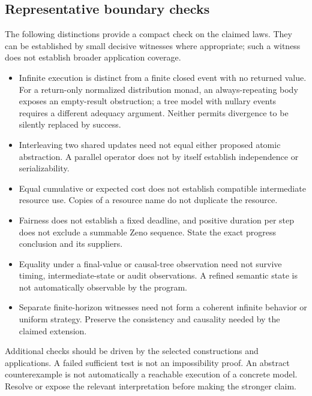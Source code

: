 \documentclass[11pt,a4paper]{article}
\begin{document}
\subsection{Representative boundary checks}
The following distinctions provide a compact check on the claimed laws. They can be established by small decisive witnesses where appropriate; such a witness does not establish broader application coverage.
\begin{itemize}
\item Infinite execution is distinct from a finite closed event with no returned value. For a return-only normalized distribution monad, an always-repeating body exposes an empty-result obstruction; a tree model with nullary events requires a different adequacy argument. Neither permits divergence to be silently replaced by success.
\item Interleaving two shared updates need not equal either proposed atomic abstraction. A parallel operator does not by itself establish independence or serializability.
\item Equal cumulative or expected cost does not establish compatible intermediate resource use. Copies of a resource name do not duplicate the resource.
\item Fairness does not establish a fixed deadline, and positive duration per step does not exclude a summable Zeno sequence. State the exact progress conclusion and its suppliers.
\item Equality under a final-value or causal-tree observation need not survive timing, intermediate-state or audit observations. A refined semantic state is not automatically observable by the program.
\item Separate finite-horizon witnesses need not form a coherent infinite behavior or uniform strategy. Preserve the consistency and causality needed by the claimed extension.
\end{itemize}

Additional checks should be driven by the selected constructions and applications. A failed sufficient test is not an impossibility proof. An abstract counterexample is not automatically a reachable execution of a concrete model. Resolve or expose the relevant interpretation before making the stronger claim.
\end{document}

